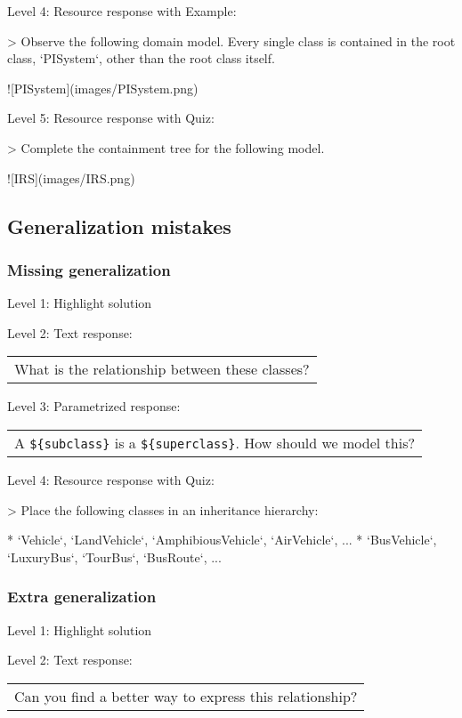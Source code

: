 \noindent Level 4: Resource response with Example:

> Observe the following domain model. Every single class is contained in the 
root class, `PISystem`, other than the root class itself.

![PISystem](images/PISystem.png)

\noindent Level 5: Resource response with Quiz:

> Complete the containment tree for the following model.

![IRS](images/IRS.png)


\subsection{Generalization mistakes}

\subsubsection{Missing generalization}

\noindent Level 1: Highlight solution \medskip

\noindent Level 2: Text response: \medskip

\begin{tabular}{|c}
What is the relationship between these classes?
\end{tabular} \medskip

\noindent Level 3: Parametrized response: \medskip

\begin{tabular}{|c}
A \verb|${subclass}| is a \verb|${superclass}|. How should we model this?
\end{tabular} \medskip

\noindent Level 4: Resource response with Quiz:

> Place the following classes in an inheritance hierarchy:

* `Vehicle`, `LandVehicle`, `AmphibiousVehicle`, `AirVehicle`, ...
* `BusVehicle`, `LuxuryBus`, `TourBus`, `BusRoute`, ...


\subsubsection{Extra generalization}

\noindent Level 1: Highlight solution \medskip

\noindent Level 2: Text response: \medskip

\begin{tabular}{|c}
Can you find a better way to express this relationship?
\end{tabular} \medskip

